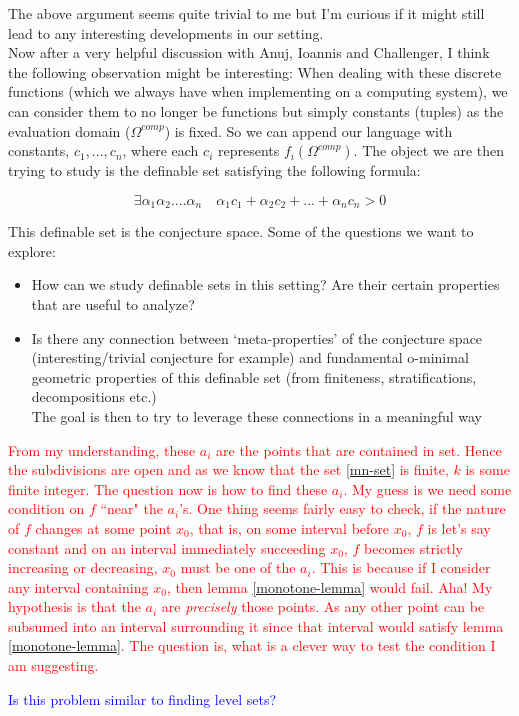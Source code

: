 The above argument seems quite trivial to me but I'm curious if it might still lead to any interesting developments in our setting.\\
Now after a very helpful discussion with Anuj, Ioannis and Challenger, I think the following observation might be interesting:
When dealing with these discrete functions (which we always have when implementing on a computing system), we can consider them to no longer be functions but simply constants (tuples) as the evaluation domain ($\Omega^{comp}$) is fixed. So we can append our language with constants, $c_1,...,c_n$, where each $c_i$ represents $f_i(\Omega^{comp})$. The object we are then trying to study is the definable set satisfying the following formula:

\begin{equation*}
    \exists\alpha_1\alpha_2....\alpha_n\quad\alpha_1c_1+\alpha_2c_2+...+\alpha_nc_n > 0
\end{equation*}

This definable set is the conjecture space. Some of the questions we want to explore: 
\begin{itemize}
    \item How can we study definable sets in this setting? Are their certain properties that are useful to analyze?
    \item Is there any connection between `meta-properties' of the conjecture space (interesting/trivial conjecture for example) and fundamental o-minimal geometric properties of this definable set (from finiteness, stratifications, decompositions etc.) \\ The goal is then to try to leverage these connections in a meaningful way
\end{itemize}



\textcolor{red}{From my understanding, these $a_i$ are the points that are contained in set. Hence the subdivisions are open and as we know that the set \ref{mn-set} is finite, $k$ is some finite integer. The question now is how to find these $a_i$. My guess is we need some condition on $f$ ``near" the $a_i$'s. One thing seems fairly easy to check, if the nature of $f$ changes at some point $x_0$, that is, on some interval before $x_0$, $f$ is let's say constant and on an interval immediately succeeding $x_0$, $f$ becomes strictly increasing or decreasing, $x_0$ must be one of the $a_i$. This is because if I consider any interval containing $x_0$, then lemma \ref{monotone-lemma} would fail. Aha! My hypothesis is that the $a_i$ are \textit{precisely} those points. As any other point can be subsumed into an interval surrounding it since that interval would satisfy lemma \ref{monotone-lemma}. The question is, what is a clever way to test the condition I am suggesting.}
\par
\textcolor{blue}{Is this problem similar to finding level sets?}

